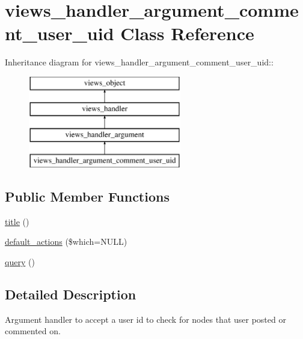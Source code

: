 \hypertarget{classviews__handler__argument__comment__user__uid}{
\section{views\_\-handler\_\-argument\_\-comment\_\-user\_\-uid Class Reference}
\label{classviews__handler__argument__comment__user__uid}
}
Inheritance diagram for views\_\-handler\_\-argument\_\-comment\_\-user\_\-uid::\begin{figure}[H]
\begin{center}
\leavevmode
\includegraphics[height=4cm]{classviews__handler__argument__comment__user__uid}
\end{center}
\end{figure}
\subsection*{Public Member Functions}
\begin{CompactItemize}
\item 
\hyperlink{classviews__handler__argument__comment__user__uid_4e106a92bbbdb88e1207fe525480c18b}{title} ()
\item 
\hyperlink{classviews__handler__argument__comment__user__uid_492e0d7daafffc95f6ac936111556559}{default\_\-actions} (\$which=NULL)
\item 
\hyperlink{classviews__handler__argument__comment__user__uid_081c8766297cd7051693061f32207709}{query} ()
\end{CompactItemize}


\subsection{Detailed Description}
Argument handler to accept a user id to check for nodes that user posted or commented on. 

